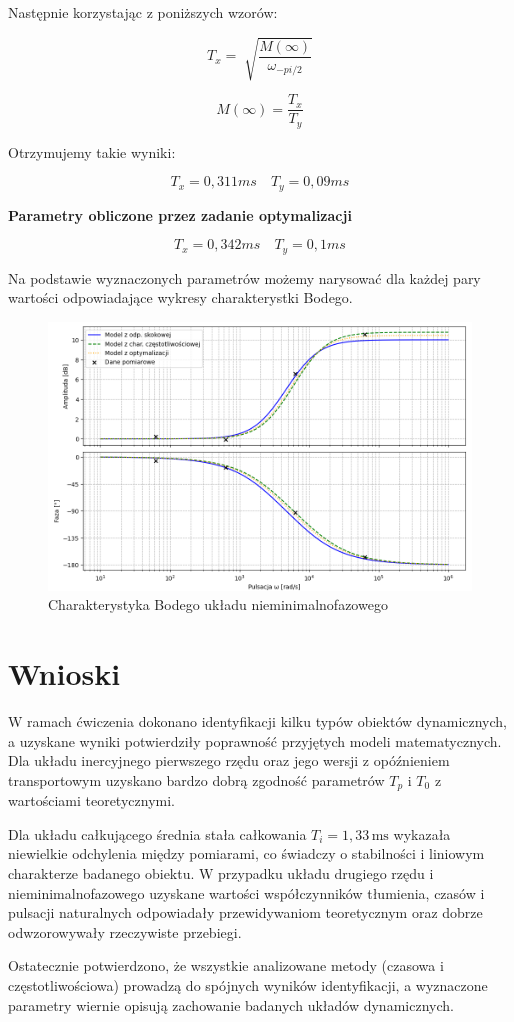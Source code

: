 \documentclass[12pt,a4paper]{article}
\begin{document}
	\noindent Następnie korzystając z poniższych wzorów:
	
	\begin{equation}
		T_x = \sqrt[]{\frac{M(\infty)}{\omega_{-pi/2}}}
	\end{equation}
	
	\begin{equation}
		M(\infty) = \frac{T_x}{T_y}
	\end{equation}
	
 	\noindent Otrzymujemy takie wyniki:
	
	\[
	T_x = 0,311ms \quad T_y = 0,09 ms
	\]
	
	\textbf{Parametry obliczone przez zadanie optymalizacji}
	
	\[
	T_x = 0,342ms \quad T_y = 0,1ms
	\]
	
	
	Na podstawie wyznaczonych parametrów możemy narysować dla każdej pary wartości odpowiadające 
	wykresy charakterystki Bodego.
	
	\begin{figure}[H]
		\centering
		\includegraphics[width=1\linewidth]{zdjecia/bode_nmf.png}
		\caption{Charakterystyka Bodego układu nieminimalnofazowego}
		\label{fig:bode_nmf}
	\end{figure}
	
	\section{Wnioski}
	
	W ramach ćwiczenia dokonano identyfikacji kilku typów obiektów dynamicznych, a uzyskane wyniki potwierdziły poprawność przyjętych modeli matematycznych. 
	Dla układu inercyjnego pierwszego rzędu oraz jego wersji z opóźnieniem transportowym uzyskano bardzo dobrą zgodność parametrów \(T_p\) i \(T_0\) z wartościami teoretycznymi. 
	
	Dla układu całkującego średnia stała całkowania \(T_i = 1{,}33\,\text{ms}\) wykazała niewielkie odchylenia między pomiarami, co świadczy o stabilności i liniowym charakterze badanego obiektu. 
	W przypadku układu drugiego rzędu i nieminimalnofazowego uzyskane wartości współczynników tłumienia, czasów i pulsacji naturalnych odpowiadały przewidywaniom teoretycznym oraz dobrze odwzorowywały rzeczywiste przebiegi.
	
	Ostatecznie potwierdzono, że wszystkie analizowane metody (czasowa i częstotliwościowa) prowadzą do spójnych wyników identyfikacji, a wyznaczone parametry wiernie opisują zachowanie badanych układów dynamicznych.
	
\end{document}
